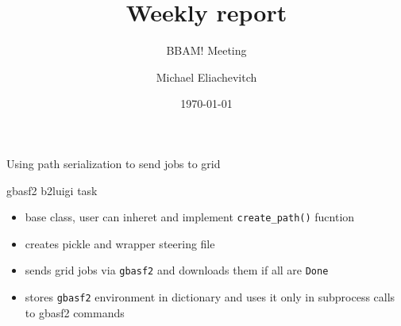 \documentclass[aspectratio=169, 16pt]{beamer}
\author{Michael Eliachevitch}
\date{\today}
\title{Weekly report}
\subtitle{BBAM! Meeting}
\institute{Physikalisches Institut --- Rheinische Friedrich-Wilhelms-Universität Bonn}
\begin{document}
\maketitle
\begin{frame}[label={sec:org19ae89f}]{Using path serialization to send jobs to grid}
\centering

\end{frame}
\begin{frame}[label={sec:org175e2ef},fragile]{gbasf2 b2luigi task}
 \begin{itemize}
\item base class, user can inheret and implement \texttt{create\_path()} fucntion
\item creates pickle and wrapper steering file
\item sends grid jobs via \texttt{gbasf2} and downloads them if all are \texttt{Done}
\item stores \texttt{gbasf2} environment in dictionary and uses it only in subprocess calls
to gbasf2 commands
\end{itemize}

\appendix
\end{frame}
\end{document}
